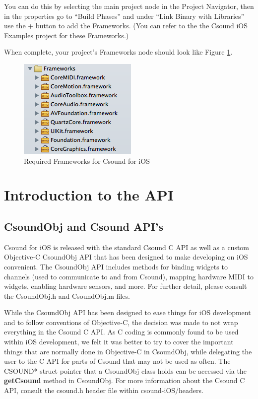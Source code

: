 \documentclass[11pt]{article}
\begin{document}
You can do this by selecting the main project node in the Project Navigator, then in the properties go to ``Build Phases'' and under ``Link Binary with Libraries'' use the + button to add the Frameworks. (You can refer to the the Csound iOS Examples project for these Frameworks.) 

When complete, your project's Frameworks node should look like Figure \ref{fig:frameworks}.

\begin{figure}[ht]
\begin{center}
\includegraphics{images/frameworks}
\end{center}
\caption{Required Frameworks for Csound for iOS}\label{fig:frameworks}
\end{figure}


\section{Introduction to the API}
\subsection{CsoundObj and Csound API's}

Csound for iOS is released with the standard Csound C API as well as a custom Objective-C CsoundObj API that has been designed to make developing on iOS convenient.  The CsoundObj API includes methods for binding widgets to channels (used to communicate to and from Csound), mapping hardware MIDI to widgets, enabling hardware sensors, and more.  For further detail, please consult the CsoundObj.h and CsoundObj.m files.

While the CsoundObj API has been designed to ease things for iOS development and to follow conventions of Objective-C, the decision was made to not wrap everything in the Csound C API.  As C coding is commonly found to be used within iOS development, we felt it was better to try to cover the important things that are normally done in Objective-C in CsoundObj, while delegating the user to the C API for parts of Csound that may not be used as often.  The CSOUND* struct pointer that a CsoundObj class holds can be accessed via the \textbf{getCsound} method in CsoundObj.  For more information about the Csound C API, consult the csound.h header file within csound-iOS/headers.
\end{document}
